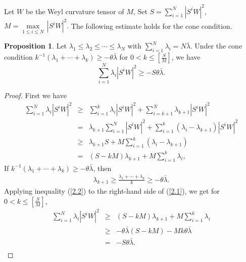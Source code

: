\documentclass[11pt, reqno]{amsart}
\numberwithin{equation}{section}
\theoremstyle{definition}
\newtheorem{proposition}[thm]{Proposition}
\begin{document}
	Let $W$ be the Weyl curvature tensor of $M$, Set $S=\sum\limits_{i=1}^{N}{{{\left| {{S}^{i}}W \right|}^{2}}}$, $M =\underset{1\le i\le N}{\mathop{\max }}\,{{\left| {{S}^{i}}W \right|}^{2}}.$	The following estimate holds for the cone condition.
	\begin{proposition} \label{proposition 1}
		Let ${\lambda }_1\le {\lambda }_2\le \cdots \le {\lambda }_N$ with $\sum\limits_{i=1}^{N}{{\lambda }_{i}}=N\bar{\lambda }.$
		Under the cone condition $k^{-1}({\lambda }_1+\cdots +{\lambda }_k)\ge -\theta \bar{\lambda }$ for $0<k\le [\frac{S}{M}]$,
		we have
		\[\sum\limits_{i=1}^{N}{{\lambda }_i\left| S^{i}W \right|^2}\ge -S\theta \bar{\lambda }.\]
	\end{proposition}
	\begin{proof} First we have
		\begin{eqnarray}
			\sum\limits_{i=1}^{N}{{\lambda }_i\left| S^{i}W \right|^2}&\ge& \sum\limits_{i=1}^{k}{{\lambda }_i\left| S^{i}W \right|^2}+\sum\limits_{i=k+1}^{N}{{\lambda }_{k+1}\left| S^{i}W \right|^2} \nonumber\\ 
			&=&{{\lambda }_{k+1}}\sum\limits_{i=1}^{N}{\left| S^{i}W \right|^2}+\sum\limits_{i=1}^{k}{({\lambda }_i-{\lambda }_{k+1})\left| S^{i}W \right|^2} \nonumber\\ 
			&\ge& {\lambda }_{k+1}S+M \sum\limits_{i=1}^{k}{({\lambda }_i-{\lambda }_{k+1})} \nonumber\\ 
			&=&(S-kM ){\lambda }_{k+1}+M \sum\limits_{i=1}^{k}{\lambda }_i, \label{2.1}
		\end{eqnarray}
		If $k^{-1}({\lambda }_1+\cdots +{\lambda }_k)\ge -\theta \bar{\lambda }$, then 
		\begin{eqnarray}
			{{\lambda }_{k+1}}\ge \frac{{\lambda }_1+\cdots +{\lambda }_k}{k}\ge -\theta \bar{\lambda }.\label{2.2}
		\end{eqnarray} 
		Applying inequality (\ref{2.2}) to the right-hand side of (\ref{2.1}), we get for $0<k\le [\frac{S}{M}],$
		\begin{eqnarray*} 
			\sum\limits_{i=1}^{N}{{\lambda }_i\left| S^{i}W \right|^2}&\ge& (S-kM ){\lambda }_{k+1}+M \sum\limits_{i=1}^{k}{\lambda }_i \\ 
			&\ge& -\theta\bar{\lambda }(S-kM )-M k\theta \bar{\lambda } \\ 
			&=&-S\theta \bar{\lambda }. \\ 
		\end{eqnarray*}
	\end{proof}
\end{document}
